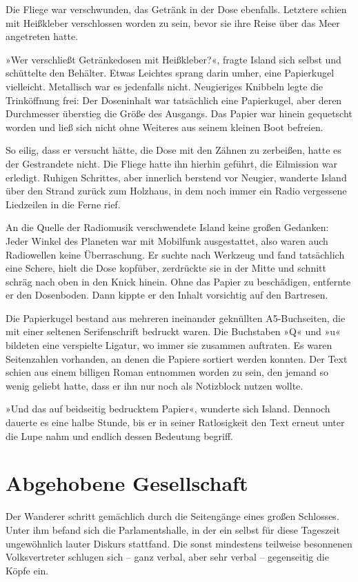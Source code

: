 Die Fliege war verschwunden, das Getränk in der Dose ebenfalls. Letztere schien mit Heißkleber verschlossen worden zu sein, bevor sie ihre Reise über das Meer angetreten hatte.

»Wer verschließt Getränkedosen mit Heißkleber?«, fragte Island sich selbst und schüttelte den Behälter. Etwas Leichtes sprang darin umher, eine Papierkugel vielleicht. Metallisch war es jedenfalls nicht. Neugieriges Knibbeln legte die Trinköffnung frei: Der Doseninhalt war tatsächlich eine Papierkugel, aber deren Durchmesser überstieg die Größe des Ausgangs. Das Papier war hinein gequetscht worden und ließ sich nicht ohne Weiteres aus seinem kleinen Boot befreien.

So eilig, dass er versucht hätte, die Dose mit den Zähnen zu zerbeißen, hatte es der Gestrandete nicht. Die Fliege hatte ihn hierhin geführt, die Eilmission war erledigt. Ruhigen Schrittes, aber innerlich berstend vor Neugier, wanderte Island über den Strand zurück zum Holzhaus, in dem noch immer ein Radio vergessene Liedzeilen in die Ferne rief.

An die Quelle der Radiomusik verschwendete Island keine großen Gedanken: Jeder Winkel des Planeten war mit Mobilfunk ausgestattet, also waren auch Radiowellen keine Überraschung. Er suchte nach Werkzeug und fand tatsächlich eine Schere, hielt die Dose kopfüber, zerdrückte sie in der Mitte und schnitt schräg nach oben in den Knick hinein. Ohne das Papier zu beschädigen, entfernte er den Dosenboden. Dann kippte er den Inhalt vorsichtig auf den Bartresen.

Die Papierkugel bestand aus mehreren ineinander geknüllten A5-Buchseiten, die mit einer seltenen Serifenschrift bedruckt waren. Die Buchstaben »Q« und »u« bildeten eine verspielte Ligatur, wo immer sie zusammen auftraten. Es waren Seitenzahlen vorhanden, an denen die Papiere sortiert werden konnten. Der Text schien aus einem billigen Roman entnommen worden zu sein, den jemand so wenig geliebt hatte, dass er ihn nur noch als Notizblock nutzen wollte.

»Und das auf beidseitig bedrucktem Papier«, wunderte sich Island. Dennoch dauerte es eine halbe Stunde, bis er in seiner Ratlosigkeit den Text erneut unter die Lupe nahm und endlich dessen Bedeutung begriff.

\chapter{Abgehobene Gesellschaft}

Der Wanderer schritt gemächlich durch die Seitengänge eines großen Schlosses. Unter ihm befand sich die Parlamentshalle, in der ein selbst für diese Tageszeit ungewöhnlich lauter Diskurs stattfand. Die sonst mindestens teilweise besonnenen Volksvertreter schlugen sich – ganz verbal, aber sehr verbal – gegenseitig die Köpfe ein.

